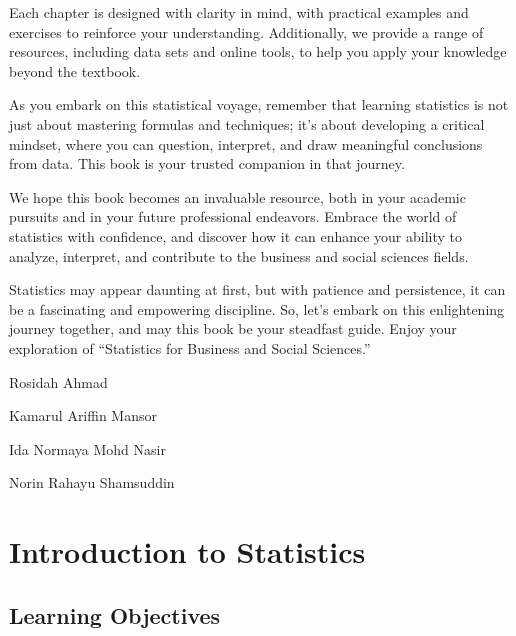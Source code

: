 \documentclass[
  a4paper,
  DIV=11,
  numbers=noendperiod,
  oneside]{scrreprt}
\begin{document}
Each chapter is designed with clarity in mind, with practical examples
and exercises to reinforce your understanding. Additionally, we provide
a range of resources, including data sets and online tools, to help you
apply your knowledge beyond the textbook.

As you embark on this statistical voyage, remember that learning
statistics is not just about mastering formulas and techniques; it's
about developing a critical mindset, where you can question, interpret,
and draw meaningful conclusions from data. This book is your trusted
companion in that journey.

We hope this book becomes an invaluable resource, both in your academic
pursuits and in your future professional endeavors. Embrace the world of
statistics with confidence, and discover how it can enhance your ability
to analyze, interpret, and contribute to the business and social
sciences fields.

Statistics may appear daunting at first, but with patience and
persistence, it can be a fascinating and empowering discipline. So,
let's embark on this enlightening journey together, and may this book be
your steadfast guide. Enjoy your exploration of ``Statistics for
Business and Social Sciences.''

Rosidah Ahmad

Kamarul Ariffin Mansor

Ida Normaya Mohd Nasir

Norin Rahayu Shamsuddin


\hypertarget{introduction-to-statistics}{%
\chapter{Introduction to Statistics}\label{introduction-to-statistics}}

\hypertarget{learning-objectives}{%
\section*{Learning Objectives}\label{learning-objectives}}

\end{document}
